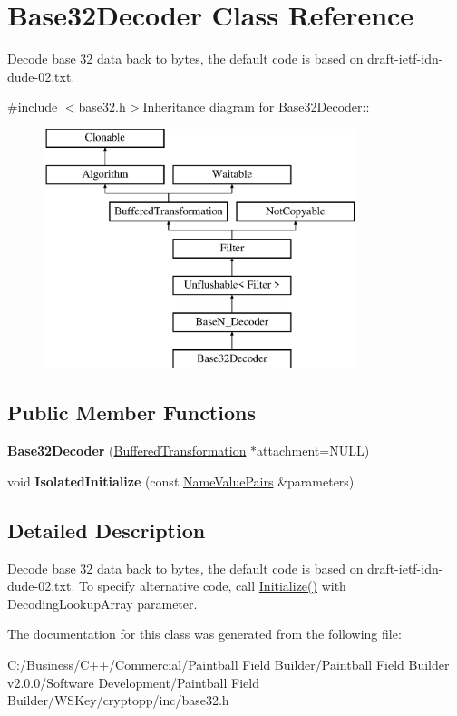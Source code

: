 \hypertarget{class_base32_decoder}{
\section{Base32Decoder Class Reference}
\label{class_base32_decoder}
}


Decode base 32 data back to bytes, the default code is based on draft-\/ietf-\/idn-\/dude-\/02.txt.  


{\ttfamily \#include $<$base32.h$>$}Inheritance diagram for Base32Decoder::\begin{figure}[H]
\begin{center}
\leavevmode
\includegraphics[height=7cm]{class_base32_decoder}
\end{center}
\end{figure}
\subsection*{Public Member Functions}
\begin{DoxyCompactItemize}
\item 
\hypertarget{class_base32_decoder_a943fd123a4eff191401db619bb821f49}{
{\bfseries Base32Decoder} (\hyperlink{class_buffered_transformation}{BufferedTransformation} $\ast$attachment=NULL)}
\label{class_base32_decoder_a943fd123a4eff191401db619bb821f49}

\item 
\hypertarget{class_base32_decoder_a4b013b73a5fa3038c9ac654cd0aceb40}{
void {\bfseries IsolatedInitialize} (const \hyperlink{class_name_value_pairs}{NameValuePairs} \&parameters)}
\label{class_base32_decoder_a4b013b73a5fa3038c9ac654cd0aceb40}

\end{DoxyCompactItemize}


\subsection{Detailed Description}
Decode base 32 data back to bytes, the default code is based on draft-\/ietf-\/idn-\/dude-\/02.txt. To specify alternative code, call \hyperlink{class_filter_a0c011bdc71755b373292e7a722e9e332}{Initialize()} with DecodingLookupArray parameter. 

The documentation for this class was generated from the following file:\begin{DoxyCompactItemize}
\item 
C:/Business/C++/Commercial/Paintball Field Builder/Paintball Field Builder v2.0.0/Software Development/Paintball Field Builder/WSKey/cryptopp/inc/base32.h\end{DoxyCompactItemize}
